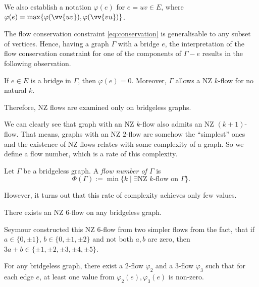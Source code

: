 We also establish a notation $\varphi(e)$ for $e=uv\in E$, where $\varphi(e)=\max\{\varphi(\vv{uv}), \varphi(\vv{vu})\}$.

The flow conservation constraint \eqref{eq:conservation} is generalisable to any subset of vertices. Hence, having a graph $\Gamma$ with a bridge $e$, the interpretation of the flow conservation constraint for one of the components of $\Gamma - e$ results in the following observation.

\begin{claim}
    If $e\in E$ is a bridge in $\Gamma$, then $\varphi(e)=0$. Moreover, $\Gamma$ allows a NZ $k$-flow for no natural $k$.
\end{claim}

Therefore, NZ flows are examined only on bridgeless graphs.

We can clearly see that graph with an NZ $k$-flow also admits an NZ $(k+1)$-flow. That means, graphs with an NZ $2$-flow are somehow the ``simplest'' ones and the existence of NZ flows relates with some complexity of a graph. So we define a flow number, which is a rate of this complexity. 

\begin{definition}
	Let $\Gamma$ be a bridgeless graph. A \emph{flow number of $\Gamma$} is
	\begin{equation*}
		\Phi(\Gamma) := \min\{k\mid\exists\text{NZ } k\text{-flow on }\Gamma\}.\label{eq:flow_number}
	\end{equation*}
\end{definition}

However, it turns out that this rate of complexity achieves only few values.

\begin{theorem} \emph{\cite[p. 133]{seymour}}
    There exists an NZ $6$-flow on any bridgeless graph.\label{th:6_flow}
\end{theorem}

Seymour constructed this NZ $6$-flow from two simpler flows from the fact, that if $a\in\{0,\pm 1\}$, $b\in\{0,\pm 1,\pm 2\}$ and not both $a, b$ are zero, then $3a+b\in\{\pm 1, \pm 2, \pm 3, \pm 4, \pm 5\}$.

\begin{lemma} \emph{\cite[p. 132]{seymour}}
    For any bridgeless graph, there exist a $2$-flow $\varphi_2$ and a $3$-flow $\varphi_3$ such that for each edge $e$, at least one value from $\varphi_2(e), \varphi_3(e)$ is non-zero.\label{lem:2_flow_3_flow_seymour}
\end{lemma}


